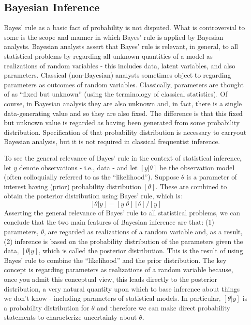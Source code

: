\subsection{Bayesian Inference}

Bayes' rule as a basic fact of probability is not disputed.
What is controversial to some is the scope and manner in which Bayes'
rule is applied by Bayesian analysts. Bayesian analysts assert that
Bayes' rule is relevant, in general, to all statistical problems by
regarding all unknown quantities of a model as realizations of random
variables - this includes data, latent variables, and also
parameters. Classical (non-Bayesian) analysts sometimes object to
regarding parameters as outcomes of random variables. Classically,
parameters are thought of as ``fixed but unknown'' (using the
terminology of classical statistics). Of course, in Bayesian analysis
they are also unknown and, in fact, there is a single data-generating
value and so they are also fixed. The difference is that this fixed
but unknown value is regarded as having been generated from some
probability distribution. Specification of that probability
distribution is necessary to carryout Bayesian analysis, but it is not
required in classical frequentist inference.


To see the general relevance of Bayes' rule in the context of
statistical inference, let $y$ denote observations - i.e., data -
and let $[y|\theta]$ be the observation model (often colloquially
referred to as the ``likelihood'').  Suppose $\theta$ 
is a parameter of
interest having (prior) probability distribution $[\theta]$. These are
combined to obtain the posterior distribution using Bayes' rule, which
is:
\[
 [\theta|y]= [y|\theta][\theta]/[y]
\]
Asserting the general relevance of Bayes' rule to all statistical
problems, we can conclude that the two main features of Bayesian
inference are that: (1) parameters, $\theta$, are regarded as realizations of
a random variable and, as a result, (2) inference is based on the
probability distribution of the parameters given the data,
$[\theta|y]$,
which is
called the posterior distribution. This is the result of using Bayes'
rule to combine the ``likelihood'' and the prior distribution.  The
key concept is regarding parameters as realizations of a random
variable because, once you admit this conceptual view, this leads
directly to the posterior distribution, a very natural quantity upon
which to base inference about things we don't know -  including
parameters of statistical models.  In particular, $[\theta|y]$ is a
probability distribution for $\theta$ and therefore we can make direct
probability statements to characterize uncertainty about
$\theta$.

